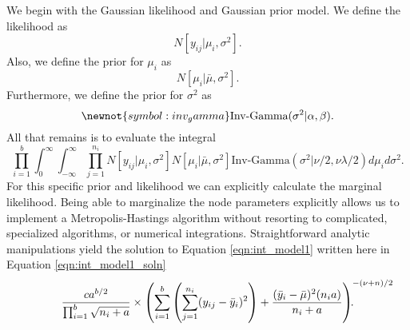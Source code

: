 We begin with the Gaussian likelihood and Gaussian prior model. We define the likelihood as 
\begin{equation}\label{eqn:norm_lhood1}
N[y_{ij} \vert \mu_i, \sigma^2].
\end{equation}
Also, we define the prior for $\mu_i$ as 
\begin{equation}\label{eqn:norm_prior1}
N[\mu_i\vert \bar{\mu}, \sigma^2 ].
\end{equation}
Furthermore, we define the prior for $\sigma^2$ as 
\begin{equation}\newnot{symbol:inv_gamma}
\text{Inv-Gamma}(\sigma^2\vert \alpha, \beta).
\end{equation}
All that remains is to evaluate the integral 
\begin{equation}\label{eqn:int_model1}
\prod_{i=1}^b \int_0^\infty \int_{-\infty}^{\infty} \prod_{j=1}^{n_i} N[y_{ij} \vert \mu_i, \sigma^2]N[\mu_i\vert \bar{\mu}, \sigma^2 ]\text{Inv-Gamma}(\sigma^2\vert \nu/2, \nu\lambda/2)d\mu_id\sigma^2.
\end{equation}
For this specific prior and likelihood we can explicitly calculate the marginal likelihood. Being able to marginalize the node parameters explicitly allows us to implement a Metropolis-Hastings algorithm without resorting to complicated, specialized algorithms, or numerical integrations. Straightforward analytic manipulations yield the solution to Equation \ref{eqn:int_model1} written here in Equation \ref{eqn:int_model1_soln}
\begin{equation}\label{eqn:int_model1_soln}
\frac{ca^{b/2}}{\prod_{i=1}^b\sqrt{n_i+a}}\times \left(\sum_{i=1}^b\left(\sum_{j=1}^{n_{i}}(y_{ij}-\bar{y}_i)^2\right)+ \frac{(\bar{y}_i -\bar{\mu})^2(n_ia)}{n_i+a} \right)^{-(\nu+n)/2}\hspace{-1.4cm}.
\end{equation}


